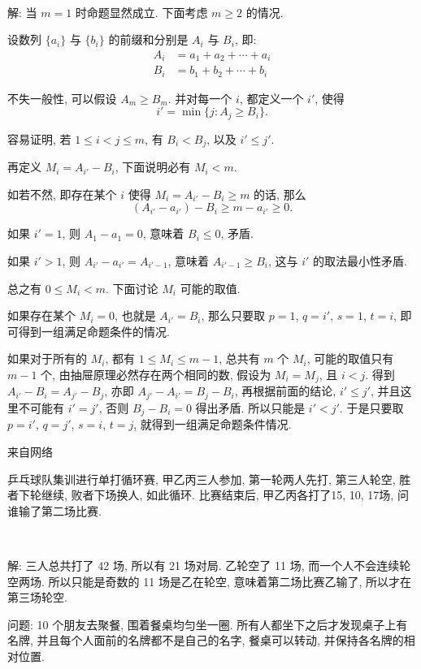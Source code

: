 ~

解: 当 $m=1$ 时命题显然成立. 下面考虑 $m\ge 2$ 的情况.

设数列 $\{a_i\}$ 与 $\{b_i\}$ 的前缀和分别是 $A_i$ 与 $B_i$, 即:
\begin{align*}
A_i &= a_1+a_2+\cdots+a_i \\
B_i &= b_1+b_2+\cdots+b_i 
\end{align*}

不失一般性, 可以假设 $A_m \ge B_m$. 并对每一个 $i$, 都定义一个 $i'$, 使得 
$$i'=\min\{j: A_j\ge B_i\} .$$

容易证明, 若 $1\le i < j \le m$, 有 $B_i<B_j$, 以及 $i ' \le j '$.

再定义 $M_i=A_{i'}-B_i$, 下面说明必有 $M_i < m$. 

如若不然, 即存在某个 $i$ 使得 $M_i = A_{i'}-B_i \ge m$ 的话, 那么 
$$(A_{i '} - a_{i '})-B_i \ge m - a_{i '} \ge 0 .$$

如果 $i' = 1$, 则 $A_1 - a_1 = 0$, 意味着 $B_i \le 0$, 矛盾.

如果 $i' > 1$, 则 $A_{i '} - a_{i '} = A_{i ' - 1}$,  意味着 $A_{i ' - 1} \ge B_i$, 这与 $i'$ 的取法最小性矛盾.

总之有 $0\le M_i < m$. 下面讨论 $M_i$ 可能的取值.

如果存在某个 $M_i = 0$, 也就是 $A_{i'} = B_i$, 那么只要取 $p=1$, $q=i'$, $s=1$, $t=i$, 即可得到一组满足命题条件的情况.

如果对于所有的 $M_i$, 都有 $1 \le M_i \le m-1$, 总共有 $m$ 个 $M_i$, 可能的取值只有 $m-1$ 个, 由抽屉原理必然存在两个相同的数, 假设为 $M_i = M_j$, 且 $i < j$. 得到 $A_{i '} - B_i = A_{j '} - B_j$, 亦即 $A_{j '} - A_{i '} = B_j - B_i$, 再根据前面的结论, $i '\le j '$, 并且这里不可能有 $i '=j '$, 否则 $B_j-B_i=0$ 得出矛盾. 所以只能是 $i' < j '$. 于是只要取 $p=i'$, $q=j'$, $s=i$, $t=j$, 就得到一组满足命题条件情况.

\newpage
\noindent 来自网络

乒乓球队集训进行单打循环赛, 甲乙丙三人参加, 第一轮两人先打, 第三人轮空, 胜者下轮继续, 败者下场换人, 如此循环. 比赛结束后, 甲乙丙各打了15, 10, 17场, 问谁输了第二场比赛.

~

解: 三人总共打了 42 场, 所以有 21 场对局. 乙轮空了 11 场, 而一个人不会连续轮空两场. 所以只能是奇数的 11 场是乙在轮空, 意味着第二场比赛乙输了, 所以才在第三场轮空.


\newpage
问题: 10 个朋友去聚餐, 围着餐桌均匀坐一圈. 所有人都坐下之后才发现桌子上有名牌, 并且每个人面前的名牌都不是自己的名字, 餐桌可以转动, 并保持各名牌的相对位置. 


